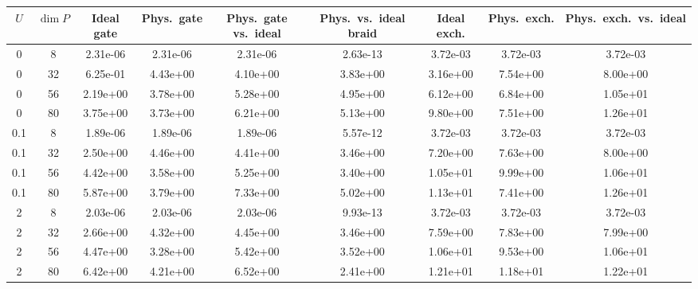 \begin{tabular}{ccccccccc}
\hline
$U$ & $\dim P$ & Ideal gate & Phys.\ gate & Phys.\ gate vs.\ ideal & Phys.\ vs.\ ideal braid & Ideal exch. & Phys.\ exch. & Phys.\ exch.\ vs.\ ideal \\
\hline
0 & 8 & 2.31e-06 & 2.31e-06 & 2.31e-06 & 2.63e-13 & 3.72e-03 & 3.72e-03 & 3.72e-03 \\
0 & 32 & 6.25e-01 & 4.43e+00 & 4.10e+00 & 3.83e+00 & 3.16e+00 & 7.54e+00 & 8.00e+00 \\
0 & 56 & 2.19e+00 & 3.78e+00 & 5.28e+00 & 4.95e+00 & 6.12e+00 & 6.84e+00 & 1.05e+01 \\
0 & 80 & 3.75e+00 & 3.73e+00 & 6.21e+00 & 5.13e+00 & 9.80e+00 & 7.51e+00 & 1.26e+01 \\
\hline
0.1 & 8 & 1.89e-06 & 1.89e-06 & 1.89e-06 & 5.57e-12 & 3.72e-03 & 3.72e-03 & 3.72e-03 \\
0.1 & 32 & 2.50e+00 & 4.46e+00 & 4.41e+00 & 3.46e+00 & 7.20e+00 & 7.63e+00 & 8.00e+00 \\
0.1 & 56 & 4.42e+00 & 3.58e+00 & 5.25e+00 & 3.40e+00 & 1.05e+01 & 9.99e+00 & 1.06e+01 \\
0.1 & 80 & 5.87e+00 & 3.79e+00 & 7.33e+00 & 5.02e+00 & 1.13e+01 & 7.41e+00 & 1.26e+01 \\
\hline
2 & 8 & 2.03e-06 & 2.03e-06 & 2.03e-06 & 9.93e-13 & 3.72e-03 & 3.72e-03 & 3.72e-03 \\
2 & 32 & 2.66e+00 & 4.32e+00 & 4.45e+00 & 3.46e+00 & 7.59e+00 & 7.83e+00 & 7.99e+00 \\
2 & 56 & 4.47e+00 & 3.28e+00 & 5.42e+00 & 3.52e+00 & 1.06e+01 & 9.53e+00 & 1.06e+01 \\
2 & 80 & 6.42e+00 & 4.21e+00 & 6.52e+00 & 2.41e+00 & 1.21e+01 & 1.18e+01 & 1.22e+01 \\
\hline
\end{tabular}
